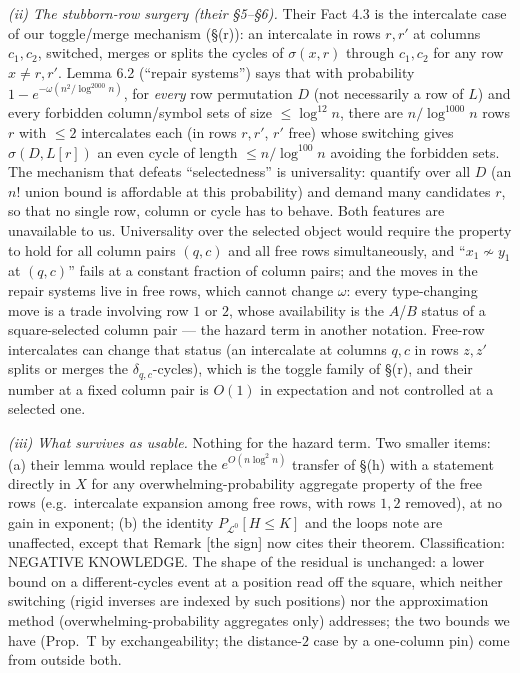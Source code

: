 \emph{(ii) The stubborn-row surgery (their \S5--\S6).}  Their Fact 4.3 is
the intercalate case of our toggle/merge mechanism (\S(r)): an
intercalate in rows $r,r'$ at columns $c_1,c_2$, switched, merges or
splits the cycles of $\sigma(x,r)$ through $c_1,c_2$ for any row $x\ne r,r'$.
Lemma 6.2 (``repair systems'') says that with probability
$1-e^{-\omega(n^2/\log^{2000}n)}$, for \emph{every} row permutation $D$
(not necessarily a row of $L$) and every forbidden column/symbol sets
of size $\le\log^{12}n$, there are $n/\log^{1000}n$ rows $r$ with
$\le2$ intercalates each (in rows $r,r'$, $r'$ free) whose switching
gives $\sigma(D,L[r])$ an even cycle of length $\le n/\log^{100}n$
avoiding the forbidden sets.  The mechanism that defeats
``selectedness'' is universality: quantify over all $D$ (an $n!$ union
bound is affordable at this probability) and demand many
candidates $r$, so that no single row, column or cycle has to behave.
Both features are unavailable to us.  Universality over the selected
object would require the property to hold for all column pairs
$(q,c)$ and all free rows simultaneously, and ``$x_1\not\sim y_1$ at
$(q,c)$'' fails at a constant fraction of column pairs; and the moves
in the repair systems live in free rows, which cannot change $\omega$:
every type-changing move is a trade involving row $1$ or $2$, whose
availability is the $A$/$B$ status of a square-selected column pair
--- the hazard term in another notation.  Free-row intercalates can
change that status (an intercalate at columns $q,c$ in rows $z,z'$
splits or merges the $\delta_{q,c}$-cycles), which is the toggle family
of \S(r), and their number at a fixed column pair is $O(1)$ in
expectation and not controlled at a selected one.

\emph{(iii) What survives as usable.}  Nothing for the hazard term.
Two smaller items: (a) their lemma would replace the $e^{O(n\log^2n)}$
transfer of \S(h) with a statement directly in $X$ for any
overwhelming-probability aggregate property of the free rows (e.g.\
intercalate expansion among free rows, with rows $1,2$ removed), at no
gain in exponent; (b) the identity $P_{\mathcal L^0}[H\le K]$ and the
loops note are unaffected, except that Remark [the sign] now cites
their theorem.  Classification: NEGATIVE KNOWLEDGE.  The shape of the
residual is unchanged: a lower bound on a different-cycles event at a
position read off the square, which neither switching (rigid inverses
are indexed by such positions) nor the approximation method
(overwhelming-probability aggregates only) addresses; the two bounds
we have (Prop.~T by exchangeability; the distance-$2$ case by a
one-column pin) come from outside both.
